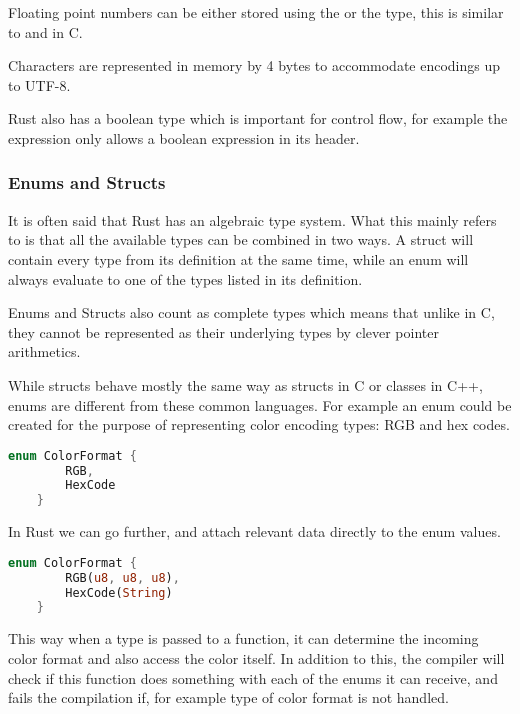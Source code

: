 Floating point numbers can be either stored using the  or the  type, this is similar to  and  in C.

Characters are represented in memory by 4 bytes to accommodate encodings up to UTF-8.

Rust also has a boolean type which is important for control flow, for example the  expression only allows a boolean expression in its header.

\subsubsection{Enums and Structs}

It is often said that Rust has an algebraic type system. What this mainly refers to is that all the available types can be combined in two ways. A struct will contain every type from its definition at the same time, while an enum will always evaluate to one of the types listed in its definition.

Enums and Structs also count as complete types which means that unlike in C, they cannot be represented as their underlying types by clever pointer arithmetics.

While structs behave mostly the same way as structs in C or classes in C++, enums are different from these common languages. For example an enum could be created for the purpose of representing color encoding types: RGB and hex codes.

\begin{lstlisting}[language=Rust,frame=single,float=!ht,style=customrust,label={lst:rust-enum},caption={Rust Enum Example}]
    enum ColorFormat {
        RGB,
        HexCode
    }
\end{lstlisting}

In Rust we can go further, and attach relevant data directly to the enum values.

\begin{lstlisting}[language=Rust,frame=single,float=!ht,style=customrust,label={lst:rust-enum-advanced},caption={Rust Enum Example With Data}]
    enum ColorFormat {
        RGB(u8, u8, u8),
        HexCode(String)
    }
\end{lstlisting}

This way when a  type is passed to a function, it can determine the incoming color format and also access the color itself. In addition to this, the compiler will check if this function does something with each of the enums it can receive, and fails the compilation if, for example  type of color format is not handled.

